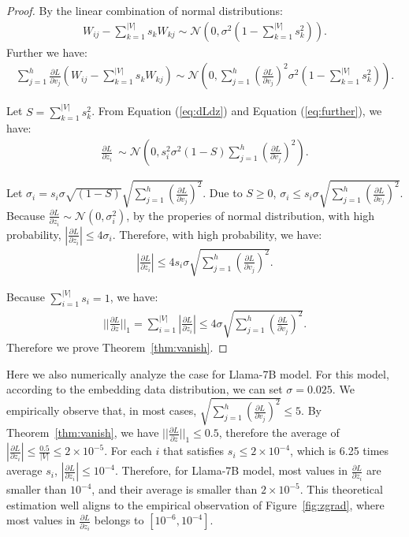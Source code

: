 \begin{proof}
By the linear combination of normal distributions:\\
\begin{align}
    W_{ij}- \sum_{k=1}^{|V|}  s_k W_{kj} \sim \mathcal{N}(0,\sigma^2(1-\sum_{k=1}^{|V|} s_k^2)).
\end{align}
Further we have:\\
\begin{align}
\label{eq:further}
    \sum_{j=1}^h \frac{\partial L}{\partial v_j} (W_{ij}- \sum_{k=1}^{|V|}  s_k W_{kj}) \sim \mathcal{N}(0,\sum_{j=1}^h (\frac{\partial L}{\partial v_j})^2 \sigma^2(1-\sum_{k=1}^{|V|} s_k^2)).
\end{align}

 Let $S=\sum_{k=1}^{|V|} s_k^2$. From Equation (\ref{eq:dLdz}) and Equation (\ref{eq:further}), we have:\\
\begin{align}
    \frac{\partial L}{\partial z_i} ~\sim \mathcal{N}(0,s_i^2\sigma^2 (1-S) \sum_{j=1}^h (\frac{\partial L}{\partial v_j})^2).
\end{align}

 Let $\sigma_i= s_i\sigma \sqrt{ (1-S)} \sqrt{\sum_{j=1}^h (\frac{\partial L}{\partial v_j})^2}$. 
 Due to $S\ge 0$, $\sigma_i \le s_i \sigma \sqrt{\sum_{j=1}^h (\frac{\partial L}{\partial v_j})^2}$. Because $\frac{\partial L}{\partial z_i} \sim \mathcal{N}(0,\sigma_i^2)$, by the properies of normal distribution, with high probability, $|\frac{\partial L}{\partial z_i}| \le 4\sigma_i$.   Therefore, with high probability,  we have:\\
\begin{align}
    |\frac{\partial L}{\partial z_i}| \le 4 s_i \sigma \sqrt{\sum_{j=1}^h (\frac{\partial L}{\partial v_j})^2}.
\end{align}


Because $\sum_{i=1}^{|V|}s_i=1$, we have:\\
\begin{align}
||\frac{\partial L}{\partial z} ||_1=\sum_{i=1}^{|V|} |\frac{\partial L}{\partial z_i}| \le 4  \sigma \sqrt{\sum_{j=1}^h (\frac{\partial L}{\partial v_j})^2}.
\end{align}
Therefore we prove Theorem~\ref{thm:vanish}.
\end{proof}

Here we also numerically analyze the case for Llama-7B model. For this model, according to the embedding data distribution, we can set $\sigma=0.025$. We empirically observe that, in most cases, $\sqrt{\sum_{j=1}^h (\frac{\partial L}{\partial v_j})^2}\le 5$. By Theorem~\ref{thm:vanish}, we have $||\frac{\partial L}{\partial z} ||_1\le 0.5$, therefore the average of $|\frac{\partial L}{\partial z_i}|\le \frac{0.5}{|V|}\le 2\times 10^{-5}$. For each $i$ that satisfies $s_i\le 2\times 10^{-4}$, which is 6.25 times average $s_i$, $|\frac{\partial L}{\partial z_i}|\le 10^{-4}$. Therefore, for Llama-7B model, most values in $\frac{\partial L}{\partial z_i}$ are smaller than $10^{-4}$, and their average is smaller than $2\times 10^{-5}$. This theoretical estimation well aligns to the empirical observation of Figure~\ref{fig:zgrad}, where most values in $\frac{\partial L}{\partial z_i}$ belongs to $[10^{-6},10^{-4}]$.


